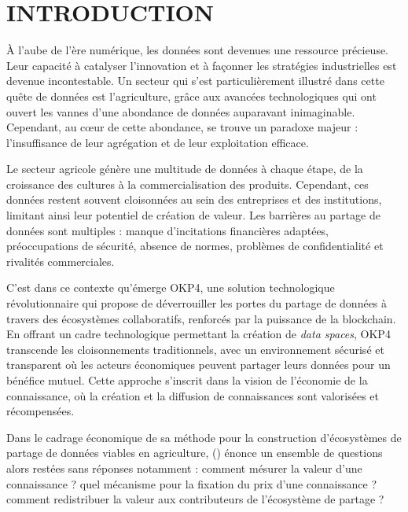 \vspace*{-1cm}
\chapter*{INTRODUCTION}
\setcounter{page}{1}

À l'aube de l'ère numérique, les données sont devenues une ressource précieuse. Leur capacité à catalyser l'innovation et à façonner les stratégies industrielles est devenue incontestable. Un secteur qui s'est particulièrement illustré dans cette quête de données est l'agriculture, grâce aux avancées technologiques qui ont ouvert les vannes d'une abondance de données auparavant inimaginable. Cependant, au cœur de cette abondance, se trouve un paradoxe majeur : l'insuffisance de leur agrégation et de leur exploitation efficace.

Le secteur agricole génère une multitude de données à chaque étape, de la croissance des cultures à la commercialisation des produits. Cependant, ces données restent souvent cloisonnées au sein des entreprises et des institutions, limitant ainsi leur potentiel de création de valeur. Les barrières au partage de données sont multiples : manque d’incitations financières adaptées, préoccupations de sécurité, absence de normes, problèmes de confidentialité et rivalités commerciales.

C'est dans ce contexte qu'émerge OKP4, une solution technologique révolutionnaire qui propose de déverrouiller les portes du partage de données à travers des écosystèmes collaboratifs, renforcés par la puissance de la blockchain. En offrant un cadre technologique permettant la création de \textit{data spaces}, OKP4 transcende les cloisonnements traditionnels, avec un environnement sécurisé et transparent où les acteurs économiques peuvent partager leurs données pour un bénéfice mutuel. Cette approche s'inscrit dans la vision de l'économie de la connaissance, où la création et la diffusion de connaissances sont valorisées et récompensées.

Dans le cadrage économique de sa méthode pour la construction d'écosystèmes de partage de données viables en agriculture, \citeauthor{pelliet_pourquoi_2021} (\citeyear{pelliet_pourquoi_2021}) énonce un ensemble de questions alors restées sans réponses notamment : comment mésurer la valeur d'une connaissance ? quel mécanisme pour la fixation du prix d'une connaissance ? comment redistribuer la valeur aux contributeurs de l'écosystème de partage ?

